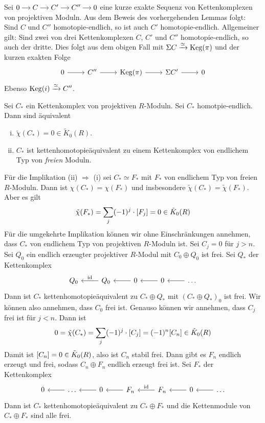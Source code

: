 \begin{bemerkung}
	Sei \(
		\begin{tikzcd}[cramped,sep=small]
			0 \rar & C \rar & C' \rar & C'' \rar & 0
		\end{tikzcd}
	\) eine kurze exakte Sequenz von Kettenkomplexen von projektiven Moduln.
	Aus dem Beweis des vorhergehenden Lemmas folgt: Sind $C$ und $C''$ homotopie-endlich, so ist auch $C'$ homotopie-endlich.
	Allgemeiner gilt: Sind zwei von drei Kettenkomplexen $C$, $C'$ und $C''$ homotopie-endlich, so auch der dritte.
	Dies folgt aus dem obigen Fall mit $\Sigma C \xrightarrow{\simeq} \Keg(\pi)$ und der kurzen exakten Folge 
	\[
		\begin{tikzcd}
			0 \rar & C'' \rar & \Keg(\pi) \rar & \Sigma C' \rar & 0
		\end{tikzcd}
	\]
	Ebenso $\Keg(i) \xrightarrow{\simeq} C''$.
\end{bemerkung}

\begin{satz}
	Sei $C_*$ ein Kettenkomplex von projektiven $R$-Moduln.
	Sei $C_*$ homotpie-endlich.
	Dann sind äquivalent
	\begin{enumerate}[(i)]
		\item $\tilde{\chi}(C_*) =0 \in \tilde{K}_0(R)$.
		\item $C_*$ ist kettenhomotopieäquivalent zu einem Kettenkomplex von endlichem Typ von \emph{freien} Moduln.
	\end{enumerate}
\end{satz}
\begin{beweis}
	Für die Implikation (ii) $\Rightarrow$ (i)  sei $C_* \simeq F_*$ mit $F_*$ von endlichem Typ von freien $R$-Moduln.
	Dann ist $\chi(C_*) = \chi(F_*)$ und insbesondere $\tilde{\chi}(C_*) = \tilde{\chi}(F_*)$.
	Aber es gilt
	\[
		\tilde{\chi}(F_*) = \sum_{j} (-1)^j \cdot \benbrace*{F_j} =0 \in \tilde{K}_0(R)
	\]
	Für die umgekehrte Implikation können wir ohne Einschränkungen annehmen, dass $C_*$ von endlichem Typ von projektiven $R$-Moduln ist.
	Sei $C_j=0$ für $j>n$.
	Sei $Q_0$ ein endlich erzeugter projektiver $R$-Modul mit $C_0 \oplus Q_0$ ist frei.
	Sei $Q_*$ der Kettenkomplex
	\[
		\begin{tikzcd}
			Q_0 & Q_0 \lar["\id"'] & 0 \lar & 0 \lar & \ldots \lar 
		\end{tikzcd}
	\]
	Dann ist $C_*$ kettenhomotopieäquivalent zu $C_* \oplus Q_*$ mit $(C_* \oplus Q_*)_0$ ist frei.
	Wir können also annehmen, dass $C_0$ frei ist.
	Genauso können wir annehmen, dass $C_j$ frei ist für $j<n$.
	Dann ist
	\[
		0 = \tilde{\chi}(C_*) = \sum_j (-1)^j \cdot \benbrace*{C_j} = (-1)^n \benbrace*{C_n} \in \tilde{K}_0(R)
	\]
	Damit ist $\benbrace*{C_n}=0 \in \tilde{K}_0(R)$, also ist $C_n$ stabil frei.
	Dann gibt es $F_n$ endlich erzeugt und frei, sodass $C_n \oplus F_n$ endlich erzeugt frei ist.
	Sei $F_*$ der Kettenkomplex
	\[
		\begin{tikzcd}
			0 &  \ldots \lar & 0 \lar & F_n \lar & F_n \lar["\id"'] & 0 \lar & \ldots \lar
		\end{tikzcd}
	\]
	Dann ist $C_*$ kettenhomotopieäquivalent zu $C_* \oplus F_*$ und die Kettenmodule von $C_* \oplus F_*$ sind alle frei.
\end{beweis}

